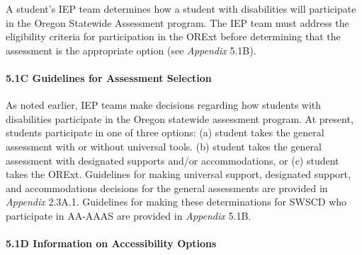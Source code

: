 \documentclass[]{article}
\let\oldparagraph\paragraph
\renewcommand{\paragraph}[1]{\oldparagraph{#1}\mbox{}}
\begin{document}
A student's IEP team determines how a student with disabilities will
participate in the Oregon Statewide Assessment program. The IEP team
must address the eligibility criteria for participation in the ORExt
before determining that the assessment is the appropriate option (see
\emph{Appendix} 5.1B).

\hypertarget{c-guidelines-for-assessment-selection}{%
\paragraph{5.1C Guidelines for Assessment
Selection}\label{c-guidelines-for-assessment-selection}}

As noted earlier, IEP teams make decisions regarding how students with
disabilities participate in the Oregon statewide assessment program. At
present, students participate in one of three options: (a) student takes
the general assessment with or without universal tools. (b) student
takes the general assessment with designated supports and/or
accommodations, or (c) student takes the ORExt. Guidelines for making
universal support, designated support, and accommodations decisions for
the general assessments are provided in \emph{Appendix} 2.3A.1.
Guidelines for making these determinations for SWSCD who participate in
AA-AAAS are provided in \emph{Appendix} 5.1B.

\hypertarget{d-information-on-accessibility-options}{%
\paragraph{5.1D Information on Accessibility
Options}\label{d-information-on-accessibility-options}}
\end{document}
